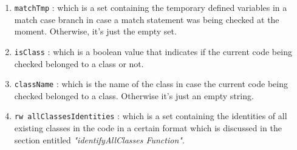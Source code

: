 \documentclass[11pt]{report}
\begin{document}
\begin{enumerate}
\item \texttt{matchTmp} : which is a set containing the temporary defined variables in a match case branch in case a match statement was being checked at the moment. Otherwise, it's just the empty set.
\item \texttt{isClass} : which is a boolean value that indicates if the current code being checked belonged to a class or not.
\item \texttt{className} : which is the name of the class in case the current code being checked belonged to a class. Otherwise it's just an empty string.
\item \texttt{rw allClassesIdentities} : which is a set containing the identities of all existing classes in the code in a certain format which is discussed in the section entitled \textsl{"identifyAllClasses Function"}.
\end{enumerate}
\end{document}
